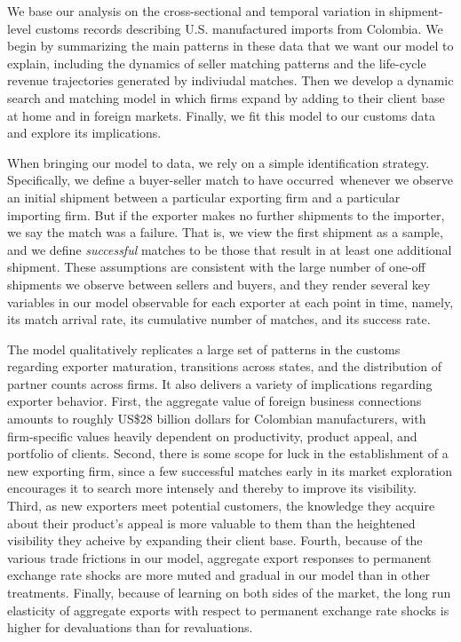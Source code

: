 \documentclass[12pt]{article}
\begin{document}
We base our analysis on the cross-sectional and temporal variation in
shipment-level customs records describing U.S. manufactured imports from
Colombia. We begin by summarizing the main patterns in these data that we
want our model to explain, including the dynamics of seller matching
patterns and the life-cycle revenue trajectories generated by indiviudal
matches. Then we develop a dynamic search and matching model in which firms
expand by adding to their client base at home and in foreign markets.
Finally, we fit this model to our customs data and explore its implications.

When bringing our model to data, we rely on a simple identification
strategy. Specifically, we define a buyer-seller match to have occurred\
whenever we observe an initial shipment between a particular exporting firm
and a particular importing firm. But if the exporter makes no further
shipments to the importer, we say the match was a failure. That is, we view
the first shipment as a sample, and we define \textit{successful} matches to
be those that result in at least one additional shipment. These assumptions
are consistent with the large number of one-off shipments we observe between
sellers and buyers, and they render several key variables in our model
observable for each exporter at each point in time, namely, its match
arrival rate, its cumulative number of matches, and its success rate.

The model qualitatively replicates a large set of patterns in the customs
regarding exporter maturation, transitions across states, and the
distribution of partner counts across firms. It also delivers a variety of
implications regarding exporter behavior. First, the aggregate value of foreign
business connections amounts to roughly US\$28 billion dollars for Colombian
manufacturers, with firm-specific values heavily dependent on productivity,
product appeal, and portfolio of clients. Second, there is some scope for
luck in the establishment of a new exporting firm, since a few successful
matches early in its market exploration encourages it to search more
intensely and thereby to improve its visibility. Third, as new exporters meet potential customers, the knowledge they acquire about their product's appeal is more valuable to them than the heightened visibility they acheive by expanding their client base. Fourth, because of the various trade frictions in our model, aggregate export responses to permanent exchange rate shocks are more muted and gradual in our model than in other treatments. Finally, because of learning on both sides of the market, the long run elasticity of aggregate
exports with respect to permanent exchange rate shocks is higher for devaluations than for revaluations. 
\end{document}
